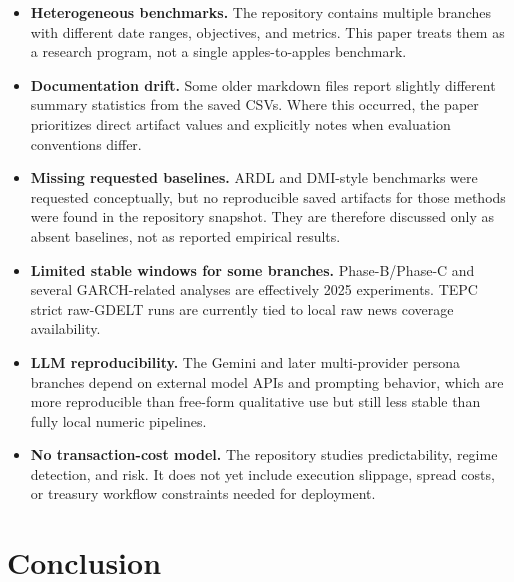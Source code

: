 \documentclass[11pt,a4paper]{article}
\begin{document}
\begin{itemize}[leftmargin=*]
    \item \textbf{Heterogeneous benchmarks.} The repository contains multiple branches with different date ranges, objectives, and metrics. This paper treats them as a research program, not a single apples-to-apples benchmark.

    \item \textbf{Documentation drift.} Some older markdown files report slightly different summary statistics from the saved CSVs. Where this occurred, the paper prioritizes direct artifact values and explicitly notes when evaluation conventions differ.

    \item \textbf{Missing requested baselines.} ARDL and DMI-style benchmarks were requested conceptually, but no reproducible saved artifacts for those methods were found in the repository snapshot. They are therefore discussed only as absent baselines, not as reported empirical results.

    \item \textbf{Limited stable windows for some branches.} Phase-B/Phase-C and several GARCH-related analyses are effectively 2025 experiments. TEPC strict raw-GDELT runs are currently tied to local raw news coverage availability.

    \item \textbf{LLM reproducibility.} The Gemini and later multi-provider persona branches depend on external model APIs and prompting behavior, which are more reproducible than free-form qualitative use but still less stable than fully local numeric pipelines.

    \item \textbf{No transaction-cost model.} The repository studies predictability, regime detection, and risk. It does not yet include execution slippage, spread costs, or treasury workflow constraints needed for deployment.
\end{itemize}

\section{Conclusion}
\end{document}
